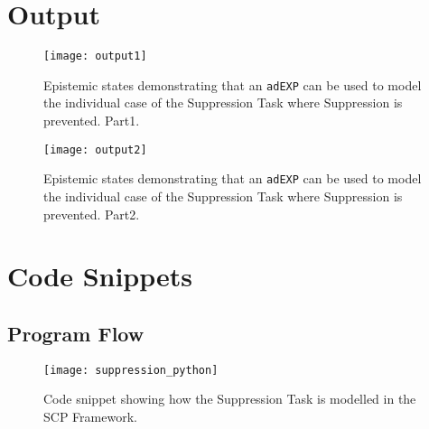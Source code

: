 \section{Output}
\begin{figure}
\centering \texttt{[image: output1]}
\caption{Epistemic states demonstrating that an \texttt{adEXP} can be used to model the individual case of the Suppression Task where Suppression is prevented. Part1.}
\label{fig:suppression_python}
\end{figure}
\begin{figure}
\centering \texttt{[image: output2]}
\caption{Epistemic states demonstrating that an \texttt{adEXP} can be used to model the individual case of the Suppression Task where Suppression is prevented. Part2.}
\label{fig:suppression_python}
\end{figure}

\section{Code Snippets}
\subsection{Program Flow}
\begin{figure}
\centering \texttt{[image: suppression\_python]}
\caption{Code snippet showing how the Suppression Task is modelled in the SCP Framework.}
\label{fig:suppression_python}
\end{figure}

